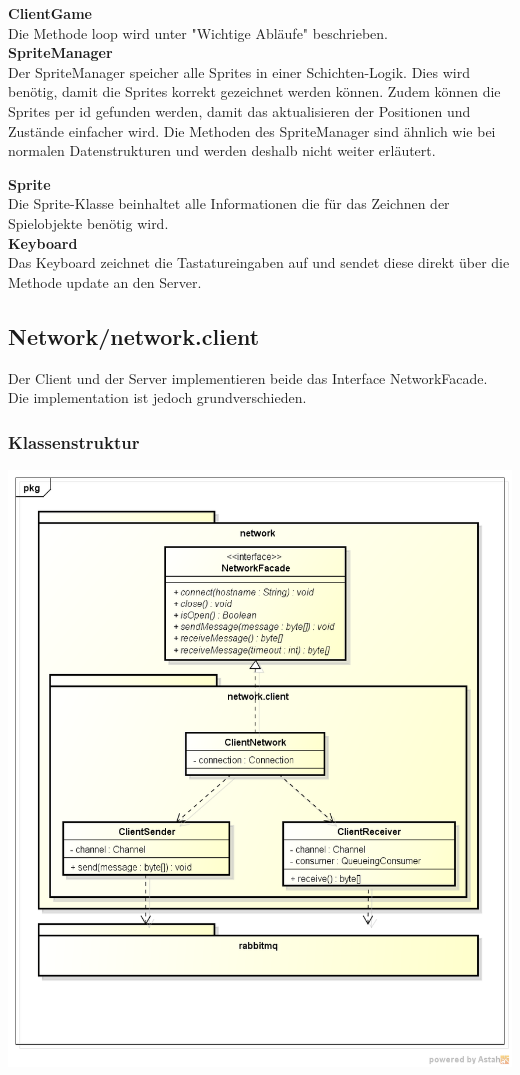 \documentclass[11pt]{scrartcl}
\begin{document}
\textbf{ClientGame}\\
Die Methode loop wird unter "Wichtige Abläufe" beschrieben.\\

\textbf{SpriteManager}\\
Der SpriteManager speicher alle Sprites in einer Schichten-Logik. Dies wird benötig, damit die Sprites korrekt gezeichnet werden können. Zudem können die Sprites per id gefunden werden, damit das aktualisieren der Positionen und Zustände einfacher wird. Die Methoden des SpriteManager sind ähnlich wie bei normalen Datenstrukturen und werden deshalb nicht weiter erläutert.

\newpage

\textbf{Sprite}\\
Die Sprite-Klasse beinhaltet alle Informationen die für das Zeichnen der Spielobjekte benötig wird.\\



\textbf{Keyboard}\\
Das Keyboard zeichnet die Tastatureingaben auf und sendet diese direkt über die Methode update an den Server.

\newpage

\subsection{Network/network.client}

Der Client und der Server implementieren beide das Interface NetworkFacade. Die implementation ist jedoch grundverschieden.

\subsubsection{Klassenstruktur}
\includegraphics[scale=0.5]{ClassDiagramNetworkClient}
\end{document}
